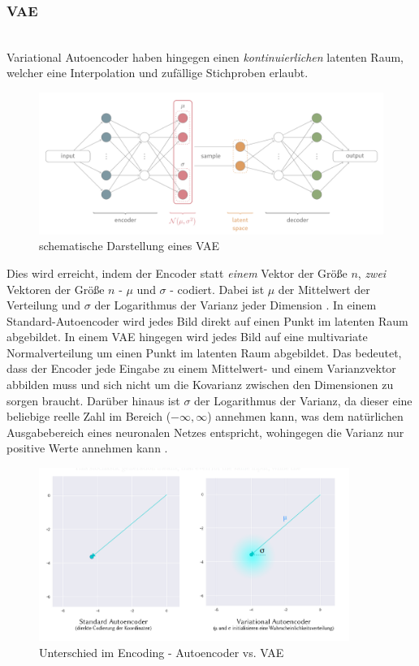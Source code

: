 \subsubsection{VAE}~\\
Variational Autoencoder haben hingegen einen \emph{kontinuierlichen} latenten Raum, welcher eine Interpolation und zufällige Stichproben erlaubt.
\begin{figure}[H]
    \centering
    \includegraphics[width=1.0\textwidth,angle=0]{abb/vae_spinner}
    \caption[schematische Darstellung eines VAE]{schematische Darstellung eines VAE \cite{Spi2018}}
\end{figure}
Dies wird erreicht, indem der Encoder statt \emph{einem} Vektor der Größe $n$, \emph{zwei} Vektoren der Größe $n$ - $\mu$ und $\sigma$ - codiert. Dabei ist $\mu$ der Mittelwert der Verteilung und $\sigma$ der Logarithmus der Varianz jeder Dimension \cite{sha18}. In einem Standard-Autoencoder wird jedes Bild direkt auf einen Punkt im latenten Raum abgebildet. In einem VAE hingegen wird jedes Bild auf eine multivariate Normalverteilung um einen Punkt im latenten Raum abgebildet. Das bedeutet, dass der Encoder jede Eingabe zu einem Mittelwert- und einem Varianzvektor abbilden muss und sich nicht um die Kovarianz zwischen den Dimensionen zu sorgen braucht. Darüber hinaus ist $\sigma$ der Logarithmus der Varianz, da dieser eine beliebige reelle Zahl im Bereich ($-\infty, \infty$) annehmen kann, was dem natürlichen Ausgabebereich eines neuronalen Netzes entspricht, wohingegen die Varianz nur positive Werte annehmen kann \cite[S.81]{fos19}.
\begin{figure}[htb]
    \centering
    \includegraphics[width=0.9\textwidth,angle=0]{abb/VAE_muandsigma.png}
    \caption[Unterschied im Encoding - Autoencoder vs. VAE]{Unterschied im Encoding - Autoencoder vs. VAE \cite{sha18}}
\end{figure}
